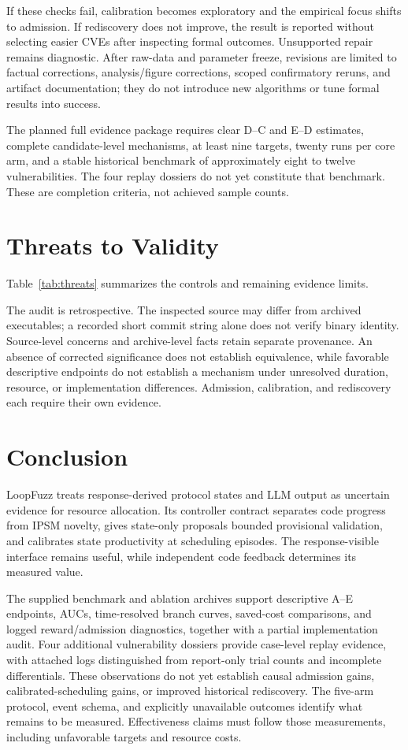 \documentclass[final,5p,times,number]{elsarticle}
\begin{document}
If these checks fail, calibration becomes exploratory and the empirical focus shifts to admission. If rediscovery does not improve, the result is reported without selecting easier CVEs after inspecting formal outcomes. Unsupported repair remains diagnostic. After raw-data and parameter freeze, revisions are limited to factual corrections, analysis/figure corrections, scoped confirmatory reruns, and artifact documentation; they do not introduce new algorithms or tune formal results into success.

The planned full evidence package requires clear D--C and E--D estimates, complete candidate-level mechanisms, at least nine targets, twenty runs per core arm, and a stable historical benchmark of approximately eight to twelve vulnerabilities. The four replay dossiers do not yet constitute that benchmark. These are completion criteria, not achieved sample counts.

\section{Threats to Validity}
Table~\ref{tab:threats} summarizes the controls and remaining evidence limits.
\label{sec:threats}


The audit is retrospective. The inspected source may differ from archived executables; a recorded short commit string alone does not verify binary identity. Source-level concerns and archive-level facts retain separate provenance. An absence of corrected significance does not establish equivalence, while favorable descriptive endpoints do not establish a mechanism under unresolved duration, resource, or implementation differences. Admission, calibration, and rediscovery each require their own evidence.

\section{Conclusion}
LoopFuzz treats response-derived protocol states and LLM output as uncertain evidence for resource allocation. Its controller contract separates code progress from IPSM novelty, gives state-only proposals bounded provisional validation, and calibrates state productivity at scheduling episodes. The response-visible interface remains useful, while independent code feedback determines its measured value.

The supplied benchmark and ablation archives support descriptive A--E endpoints, AUCs, time-resolved branch curves, saved-cost comparisons, and logged reward/admission diagnostics, together with a partial implementation audit. Four additional vulnerability dossiers provide case-level replay evidence, with attached logs distinguished from report-only trial counts and incomplete differentials. These observations do not yet establish causal admission gains, calibrated-scheduling gains, or improved historical rediscovery. The five-arm protocol, event schema, and explicitly unavailable outcomes identify what remains to be measured. Effectiveness claims must follow those measurements, including unfavorable targets and resource costs.
\end{document}
